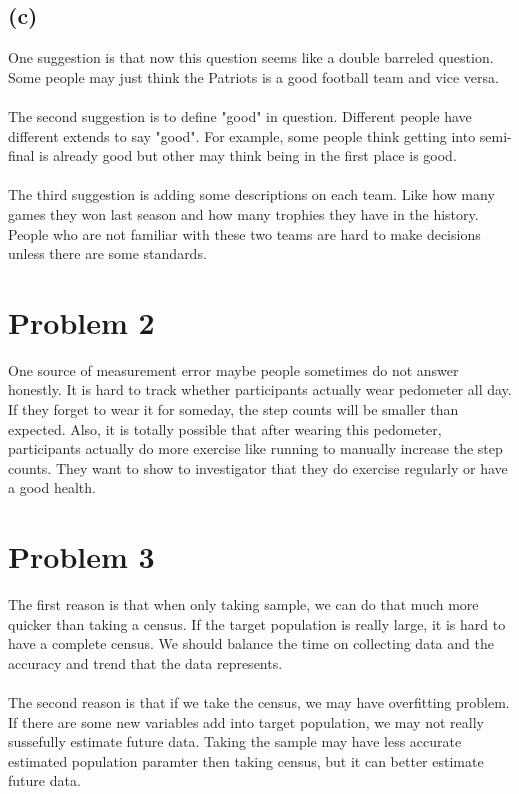\documentclass{article}
\begin{document}
\subsection*{(c)}
One suggestion is that now this question seems like a double barreled question. Some people may just think the Patriots is a good football team and vice versa.\\
\\
The second suggestion is to define "good" in question. Different people have different extends to say "good". For example, some people think getting into semi-final is already good but other may think being in the first place is good.\\
\\
The third suggestion is adding some descriptions on each team. Like how many games they won last season and how many trophies they have in the history. People who are not familiar with these two teams are hard to make decisions unless there are some standards.\\



\section*{Problem 2}

One source of measurement error maybe people sometimes do not answer honestly. It is hard to track whether participants actually wear pedometer all day. If they forget to wear it for someday, the step counts will be smaller than expected.
Also, it is totally possible that after wearing this pedometer, participants actually do more exercise like running to manually increase the step counts. They want to show to investigator that they do exercise regularly or have a good health. 




\section*{Problem 3}
The first reason is that when only taking sample, we can do that much more quicker than taking a census.
If the target population is really large, it is hard to have a complete census. We should balance the time on collecting data and the accuracy and trend that the data represents.\\
\\
The second reason is that if we take the census, we may have overfitting problem. If there are some new variables add into target population, we may not really sussefully estimate future data.
Taking the sample may have less accurate estimated population paramter then taking census, but it can better estimate future data. 
\end{document}
